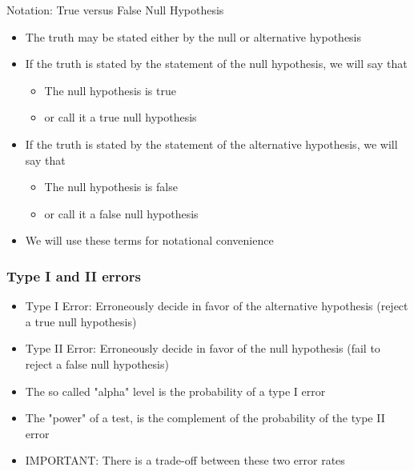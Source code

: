 \documentclass[xcolor=x11names,compress]{beamer}\usepackage[]{graphicx}\usepackage[]{color}
\begin{document}
\begin{frame}{Notation: True versus False Null Hypothesis}
  \begin{itemize}
  \item The truth may be stated either by the null or alternative hypothesis
  \item If the truth is stated by the statement of the null hypothesis, we will say that 
    \begin{itemize}
    \item The null hypothesis is true
    \item or call it a true null hypothesis
    \end{itemize}
  \item  If the truth is stated by the statement of the alternative hypothesis, we will say that 
    \begin{itemize}
    \item The null hypothesis is false
    \item or call it a false null hypothesis
    \end{itemize}
  \item We will use these terms for notational convenience
  \end{itemize}
\end{frame}



\begin{frame}
  \frametitle{Type I and II errors}
  \begin{itemize}
  \item Type I Error: Erroneously decide in favor of the alternative
        hypothesis (reject a true null hypothesis)
  \item Type II Error: Erroneously decide in favor of the null
        hypothesis (fail to reject a false null hypothesis)
  \item The so called "alpha" level is the probability of a type I error
  \item The "power" of a test, is the complement of the probability of the type II error
  \item IMPORTANT: There is a trade-off between these two error rates
  
  \end{itemize}
\end{frame}
\end{document}
